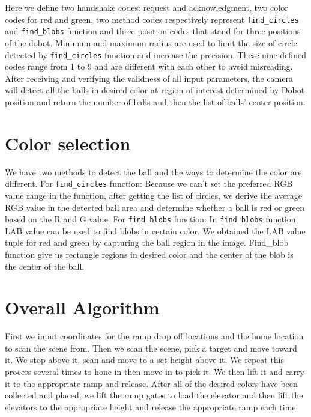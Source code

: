 \documentclass{article}
\begin{document}
\noindent Here we define two handshake codes: request and acknowledgment, two color codes for red and green, two method codes respectively represent \texttt{find\_circles} and \texttt{find\_blobs} function and three position codes that stand for three positions of the dobot. Minimum and maximum radius are used to limit the size of circle detected by \texttt{find\_circles} function and increase the precision. These nine defined codes range from 1 to 9 and are different with each other to avoid misreading. After receiving and verifying the validness of all input parameters, the camera will detect all the balls in desired color at region of interest determined by Dobot position and return the number of balls and then the list of balls’ center position.


\section{Color selection}
We have two methods to detect the ball and the ways to determine the color are different.
For \texttt{find\_circles} function:
Because we can’t set the preferred RGB value range in the function, after getting the list of circles, we derive the average RGB value in the detected ball area and determine whether a ball is red or green based on the R and G value.
For \texttt{find\_blobs} function:
In \texttt{find\_blobs} function, LAB value can be used to find blobs in certain color. We obtained the LAB value tuple for red and green by capturing the ball region in the image. Find\_blob function give us rectangle regions in desired color and the center of the blob is the center of the ball. 

\section{Overall Algorithm}
First we input coordinates for the ramp drop off locations and the home location to scan the scene from. Then we scan the scene, pick a target and move toward it. We stop above it, scan and move to a set height above it. We repeat this process several times to hone in then move in to pick it. We then lift it and carry it to the appropriate ramp and release. After all of the desired colors have been collected and placed, we lift the ramp gates to load the elevator and then lift the elevators to the appropriate height and release the appropriate ramp each time.
\end{document}
